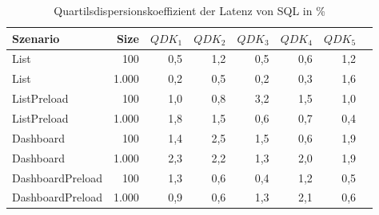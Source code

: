 
\begin{table}[ht]
\setlength{\extrarowheight}{-1pt}
\centering
\caption{Quartilsdispersionskoeffizient der Latenz von SQL in \%}
\begin{tabular}{lrrrrrrr}
\toprule
Szenario & Size & ${QDK_1}$ & ${QDK_2}$ & ${QDK_3}$& ${QDK_4}$ & ${QDK_5}$ \\
\midrule
	List & 100 & \cellcolor{red!1}  0,5 & \cellcolor{red!2}  1,2 & \cellcolor{red!1}  0,5 & \cellcolor{red!1}  0,6 & \cellcolor{red!2}  1,2 \\
	List & 1.000 & \cellcolor{red!1}  0,2 & \cellcolor{red!1}  0,5 & \cellcolor{red!1}  0,2 & \cellcolor{red!1}  0,3 & \cellcolor{red!2}  1,6 \\
	ListPreload & 100 & \cellcolor{red!1}  1,0 & \cellcolor{red!1}  0,8 & \cellcolor{red!4}  3,2 & \cellcolor{red!2}  1,5 & \cellcolor{red!1}  1,0 \\
	ListPreload & 1.000 & \cellcolor{red!2}  1,8 & \cellcolor{red!2}  1,5 & \cellcolor{red!1}  0,6 & \cellcolor{red!1}  0,7 & \cellcolor{red!1}  0,4 \\
	Dashboard & 100 & \cellcolor{red!2}  1,4 & \cellcolor{red!3}  2,5 & \cellcolor{red!2}  1,5 & \cellcolor{red!1}  0,6 & \cellcolor{red!2}  1,9 \\
	Dashboard & 1.000 & \cellcolor{red!3}  2,3 & \cellcolor{red!3}  2,2 & \cellcolor{red!2}  1,3 & \cellcolor{red!2}  2,0 & \cellcolor{red!2}  1,9 \\
	DashboardPreload & 100 & \cellcolor{red!2}  1,3 & \cellcolor{red!1}  0,6 & \cellcolor{red!1}  0,4 & \cellcolor{red!2}  1,2 & \cellcolor{red!1}  0,5 \\
	DashboardPreload & 1.000 & \cellcolor{red!1}  0,9 & \cellcolor{red!1}  0,6 & \cellcolor{red!2}  1,3 & \cellcolor{red!3}  2,1 & \cellcolor{red!1}  0,6 \\
\bottomrule
\end{tabular}
\label{tab:quartilsdispersionskoeffizient_latenz_sql}
\end{table}
	